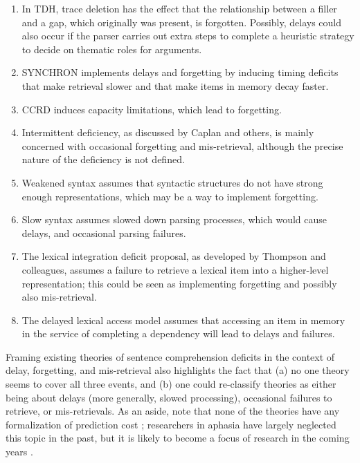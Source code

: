 \documentclass{cambridge7A}\usepackage[]{graphicx}\usepackage[]{color}
\begin{document}
\begin{enumerate}
\item
In TDH, trace deletion has the effect that the relationship between a filler and a gap, which originally was present, is forgotten. Possibly, delays could also occur if the parser carries out extra steps to complete a heuristic strategy to decide on thematic roles for arguments.
\item SYNCHRON implements delays and forgetting by inducing timing deficits that make retrieval slower and that make items in memory decay faster.
\item 
CCRD induces capacity limitations, which lead to forgetting.
\item 
Intermittent deficiency, as discussed by Caplan and others, is mainly concerned with occasional forgetting and mis-retrieval, although the precise nature of the deficiency is not defined.
\item 
Weakened syntax assumes that syntactic structures do not have strong enough representations, which may be a way to implement forgetting. 
\item Slow syntax assumes slowed down parsing processes, which would cause delays, and occasional parsing failures.
\item The lexical integration deficit proposal, as developed by Thompson and colleagues, 
assumes a failure to retrieve a lexical item into a higher-level representation; this could be seen as implementing forgetting and possibly also mis-retrieval.
\item 
The delayed lexical access model  assumes that accessing an item in memory in the service of completing a dependency will lead to delays and failures.
 \end{enumerate}


Framing existing theories of sentence comprehension deficits in the context of delay, forgetting, and mis-retrieval also highlights the fact that (a) no one theory seems to cover all three events, and (b) one could re-classify theories as either being about delays (more generally, slowed processing), occasional failures to retrieve, or mis-retrievals.
As an aside, note that none of the theories have any formalization of prediction cost \citep[e.g.,][]{Hale2001,Levy2008}; researchers in aphasia have largely neglected this topic in the past, but it is likely to become a  focus of research in the coming years \citep[see][for an interesting recent attempt using the storage cost metric from the  Dependency Locality Theory]{clark12}.
\end{document}
